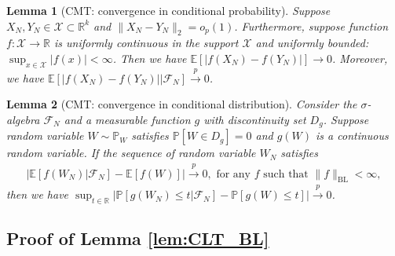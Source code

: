 \documentclass[12pt]{article}
\newtheorem{lemma}{Lemma}
\def\P{\mathbb{P}}
\def\P{\mathbb{P}}
\newcommand{\E}{\mathbb E}								%
\renewcommand{\P}{\mathbb{P}}							%
\newcommand{\convp}{\overset p \rightarrow}             %
\begin{document}
\begin{lemma}[CMT: convergence in conditional probability]\label{lem:continuous_map_varying}
	Suppose $X_N,Y_N\in\mathcal{X}\subset \mathbb{R}^k$ and $\|X_N-Y_N\|_2=o_p(1)$. Furthermore, suppose function $f:\mathcal{X}\rightarrow\mathbb{R}$ is uniformly continuous in the support $\mathcal{X}$ and uniformly bounded: $\sup_{x\in\mathcal{X}}|f(x)|<\infty$. Then we have $\E[\left|f(X_N)-f(Y_N)\right|]\rightarrow 0$. Moreover, we have $\E[\left|f(X_N)-f(Y_N)\right||\mathcal{F}_N]\convp 0$.
\end{lemma}

\begin{lemma}[CMT: convergence in conditional distribution]\label{lem:sufficient_condition_CMT}
	Consider the $\sigma$-algebra $\mathcal{F}_N$ and a measurable function $g$ with discontinuity set $D_g$. Suppose random variable $W\sim\mathbb{P}_W$ satisfies $\P[W\in D_g]=0$ and $g(W)$ is a continuous random variable. If the sequence of random variable $W_N$ satisfies
	\begin{align*}
		\left|\E[f(W_N)|\mathcal{F}_N]-\E[f(W)]\right|\convp 0, \text{ for any } f\text{ such that }\|f\|_{\mathrm{BL}}<\infty,
	\end{align*}
	then we have $\sup_{t\in\mathbb{R}}\left|\P[g(W_N)\leq t|\mathcal{F}_N]-\P[g(W)\leq t]\right|\convp 0$.
\end{lemma}


\subsection{Proof of Lemma \ref{lem:CLT_BL}}
\end{document}
